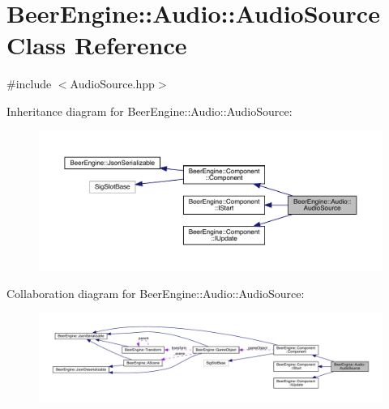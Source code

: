 \hypertarget{class_beer_engine_1_1_audio_1_1_audio_source}{}\section{Beer\+Engine\+:\+:Audio\+:\+:Audio\+Source Class Reference}
\label{class_beer_engine_1_1_audio_1_1_audio_source}


{\ttfamily \#include $<$Audio\+Source.\+hpp$>$}



Inheritance diagram for Beer\+Engine\+:\+:Audio\+:\+:Audio\+Source\+:
\nopagebreak
\begin{figure}[H]
\begin{center}
\leavevmode
\includegraphics[width=350pt]{class_beer_engine_1_1_audio_1_1_audio_source__inherit__graph}
\end{center}
\end{figure}


Collaboration diagram for Beer\+Engine\+:\+:Audio\+:\+:Audio\+Source\+:
\nopagebreak
\begin{figure}[H]
\begin{center}
\leavevmode
\includegraphics[width=350pt]{class_beer_engine_1_1_audio_1_1_audio_source__coll__graph}
\end{center}
\end{figure}
